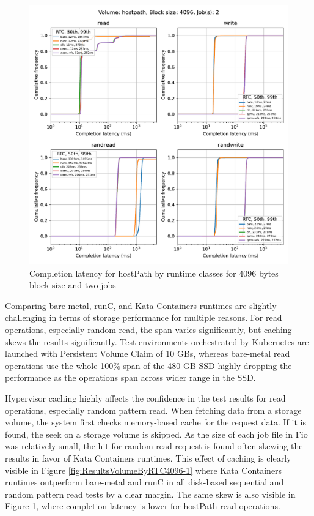 \begin{figure}[ht]
  \begin{center}
    \includegraphics[width=12cm]{results/subplot_clat_bw_by_rw(hostpath,2,4096).pdf}
    \caption{Completion latency for hostPath by runtime classes for 4096 bytes block size and two jobs}
    \label{fig:ResultsHPClatByRTC4096-2}
  \end{center}
\end{figure}

Comparing bare-metal, runC, and Kata Containers runtimes are slightly challenging in terms of storage performance for multiple reasons. For read operations, especially random read, the span varies significantly, but caching skews the results significantly. Test environments orchestrated by Kubernetes are launched with Persistent Volume Claim of 10 GBs, whereas bare-metal read operations use the whole 100\% span of the 480 GB SSD \cite{IntelSSD} highly dropping the performance as the operations span across wider range in the SSD.

Hypervisor caching highly affects the confidence in the test results for read operations, especially random pattern read. When fetching data from a storage volume, the system first checks memory-based cache for the request data. If it is found, the seek on a storage volume is skipped. As the size of each job file in Fio was relatively small, the hit for random read request is found often skewing the results in favor of Kata Containers runtimes. This effect of caching is clearly visible in Figure \ref{fig:ResultsVolumeByRTC4096-1} where Kata Containers runtimes outperform bare-metal and runC in all disk-based sequential and random pattern read tests by a clear margin. The same skew is also visible in Figure \ref{fig:ResultsHPClatByRTC4096-2}, where completion latency is lower for hostPath read operations.

